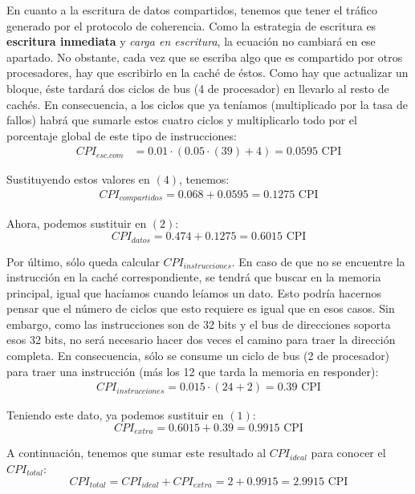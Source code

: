 \documentclass[12pt,a4paper]{article}
\begin{document}
En cuanto a la escritura de datos compartidos, tenemos que tener el tráfico generado por el protocolo de coherencia. Como la estrategia de escritura es \textbf{escritura inmediata} y \textit{carga en escritura}, la ecuación no cambiará en ese apartado. No obstante, cada vez que se escriba algo que es compartido por otros procesadores, hay que escribirlo en la caché de éstos. Como hay que actualizar un bloque, éste tardará dos ciclos de bus (4 de procesador) en llevarlo al resto de cachés. En consecuencia, a los ciclos que ya teníamos (multiplicado por la tasa de fallos) habrá que sumarle estos cuatro ciclos y multiplicarlo todo por el porcentaje global de este tipo de instrucciones:
\begin{align*}
CPI_{esc.com}&=0.01\cdot (0.05\cdot (39)+4)=0.0595\text{ CPI}
\end{align*}

Sustituyendo estos valores en $(4)$, tenemos:
\begin{align*}
CPI_{compartidos}=0.068+0.0595=0.1275 \text{ CPI}
\end{align*}

Ahora, podemos sustituir en $(2)$:
\begin{equation*}
CPI_{datos}=0.474+0.1275=0.6015\text{ CPI}
\end{equation*}

Por último, sólo queda calcular $CPI_{instrucciones}$. En caso de que no se encuentre la instrucción en la caché correspondiente, se tendrá que buscar en la memoria principal, igual que hacíamos cuando leíamos un dato. Esto podría hacernos pensar que el número de ciclos que esto requiere es igual que en esos casos. Sin embargo, como las instrucciones son de 32 bits y el bus de direcciones soporta esos 32 bits, no será necesario hacer dos veces el camino para traer la dirección completa. En consecuencia, sólo se consume un ciclo de bus (2 de procesador) para traer una instrucción (más los 12 que tarda la memoria en responder):
\begin{align*}
CPI_{instrucciones}=0.015\cdot (24+2)=0.39 \text{ CPI}
\end{align*}

Teniendo este dato, ya podemos sustituir en $(1)$:
\begin{equation*}
CPI_{extra}=0.6015+0.39=0.9915\text{ CPI}
\end{equation*}

A continuación, tenemos que sumar este resultado al $CPI_{ideal}$ para conocer el $CPI_{total}$:
\begin{equation*}
CPI_{total}=CPI_{ideal}+CPI_{extra}=2+0.9915=2.9915\text{ CPI}
\end{equation*}
\end{document}
